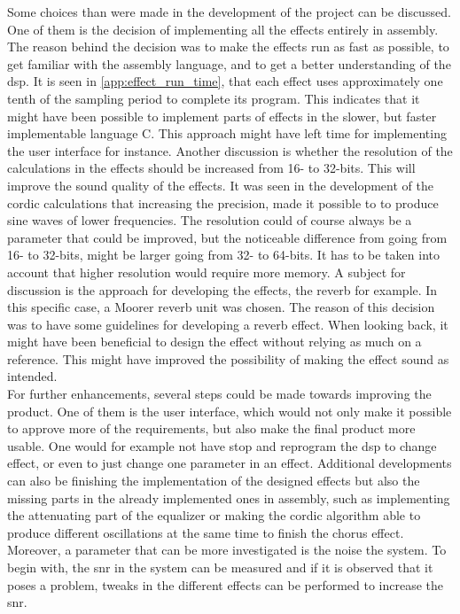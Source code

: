 Some choices than were made in the development of the project can be discussed. One of them is the decision of implementing all the effects entirely in assembly. The reason behind the decision was to make the effects run as fast as possible, to get familiar with the assembly language, and to get a better understanding of the \gls{dsp}. It is seen in \autoref{app:effect_run_time}, that each effect uses approximately one tenth of the sampling period to complete its program. This indicates that it might have been possible to implement parts of effects in the slower, but faster implementable language C. This approach might have left time for implementing the user interface for instance. 
Another discussion is whether the resolution of the calculations in the effects should be increased from 16- to 32-bits. This will improve the sound quality of the effects. It was seen in the development of the \gls{cordic} calculations that increasing the precision, made it possible to to produce sine waves of lower frequencies. The resolution could of course always be a parameter that could be improved, but the noticeable difference from going from 16- to 32-bits, might be larger going from 32- to 64-bits. It has to be taken into account that higher resolution would require more memory.  
A subject for discussion is the approach for developing the effects, the \gls{reverb} for example. In this specific case, a Moorer \gls{reverb} unit was chosen. The reason of this decision was to have some guidelines for developing a \gls{reverb} effect. When looking back, it might have been beneficial to design the effect without relying as much on a reference. This might have improved the possibility  of making the effect sound as intended. \\

For further enhancements, several steps could be made towards improving the product. One of them is the user interface, which would not only make it possible to approve more of the requirements, but also make the final product more usable. One would for example not have stop and reprogram the \gls{dsp} to change effect, or even to just change one parameter in an effect. 
Additional developments can also be finishing the implementation of the designed effects but also the missing parts in the already implemented ones in assembly, such as implementing the attenuating part of the equalizer or making the \gls{cordic} algorithm able to produce different oscillations at the same time to finish the chorus effect. 
Moreover, a parameter that can be more investigated is the noise the system. To begin with, the \gls{snr} in the system can be measured and if it is observed that it poses a problem, tweaks in the different effects can be performed to increase the \gls{snr}.